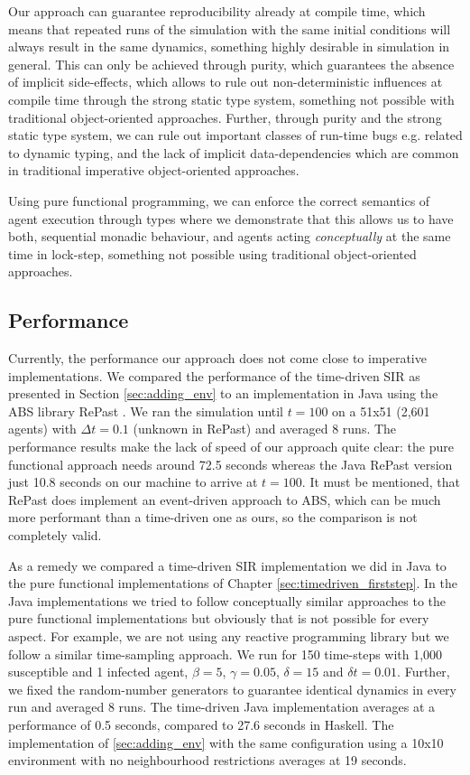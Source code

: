 Our approach can guarantee reproducibility already at compile time, which means that repeated runs of the simulation with the same initial conditions will always result in the same dynamics, something highly desirable in simulation in general. This can only be achieved through purity, which guarantees the absence of implicit side-effects, which allows to rule out non-deterministic influences at compile time through the strong static type system, something not possible with traditional object-oriented approaches. Further, through purity and the strong static type system, we can rule out important classes of run-time bugs e.g. related to dynamic typing, and the lack of implicit data-dependencies which are common in traditional imperative object-oriented approaches.

Using pure functional programming, we can enforce the correct semantics of agent execution through types where we demonstrate that this allows us to have both, sequential monadic behaviour, and agents acting \textit{conceptually} at the same time in lock-step, something not possible using traditional object-oriented approaches.

\subsection{Performance}
Currently, the performance our approach does not come close to imperative implementations. We compared the performance of the time-driven SIR as presented in Section \ref{sec:adding_env} to an implementation in Java using the ABS library RePast \cite{north_complex_2013}. We ran the simulation until $t = 100$ on a 51x51 (2,601 agents) with $\Delta t = 0.1$ (unknown in RePast) and averaged 8 runs. The performance results make the lack of speed of our approach quite clear: the pure functional approach needs around 72.5 seconds whereas the Java RePast version just 10.8 seconds on our machine to arrive at $t = 100$. It must be mentioned, that RePast does implement an event-driven approach to ABS, which can be much more performant \cite{meyer_event-driven_2014} than a time-driven one as ours, so the comparison is not completely valid. 

As a remedy we compared a time-driven SIR implementation we did in Java to the pure functional implementations of Chapter \ref{sec:timedriven_firststep}. In the Java implementations we tried to follow conceptually similar approaches to the pure functional implementations but obviously that is not possible for every aspect. For example, we are not using any reactive programming library but we follow a similar time-sampling approach. We run for 150 time-steps with 1,000 susceptible and 1 infected agent, $\beta = 5$, $\gamma = 0.05$, $\delta = 15$ and $\delta t = 0.01$. Further, we fixed the random-number generators to guarantee identical dynamics in every run and averaged 8 runs. The time-driven Java implementation averages at a performance of 0.5 seconds, compared to 27.6 seconds in Haskell. The implementation of \ref{sec:adding_env} with the same configuration using a 10x10 environment with no neighbourhood restrictions averages at 19 seconds.


